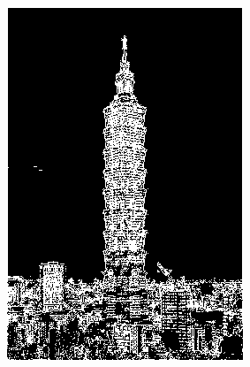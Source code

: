 \documentclass[12pt,a4paper]{report}
\begin{document}
\begin{figure}[!htb]
\begin{subfigure}{0.45\linewidth}
    \includegraphics[width=1\linewidth]{output/taipei101_Q4_t_64.png}
  \end{subfigure}
  \begin{subfigure}{0.45\linewidth}

\end{subfigure}
\end{figure}
\end{document}

